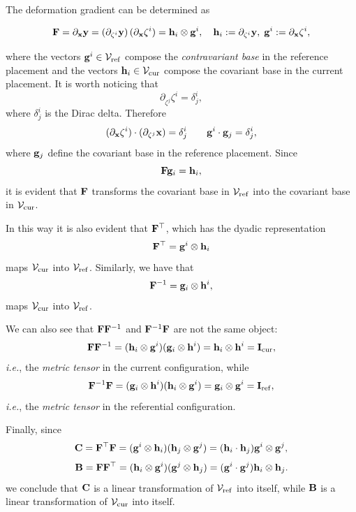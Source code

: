 	
	The deformation gradient can be determined as
\begin{definition}
		\begin{equation}\label{Fdy}
		\mathbf{F}=\partial_{\mathbf{x}} \mathbf{y}=(\partial_{\zeta^i} \mathbf{y})\,(\partial_{\mathbf{x}}\zeta^i)=\mathbf{h}_i\otimes\mathbf{g}^i, \quad \mathbf{h}_i:=\partial_{\zeta^i} \mathbf{y}, \;\mathbf{g}^i:=\partial_{\mathbf{x}}\zeta^i,
	\end{equation}
\end{definition}
	where the vectors $\mathbf{g}^i\in\operatorname{\mathcal{V}_{\textrm ref}}$ compose the \textit{contravariant base} in the reference placement and the vectors $\mathbf{h}_i\in\operatorname{\mathcal{V}_{\textrm cur}}$ compose the covariant base in the current placement. It is worth noticing that 
	\begin{equation}
	\partial_{\zeta^j}\zeta^i=\delta^{i}_j,
	\end{equation}
where $\delta^{i}_j$ is the Dirac delta. Therefore
	\begin{equation}
		(\partial_{\mathbf{x}}\zeta^i)\cdot(\partial_{\zeta^j}\mathbf{x})=\delta^i_j \qquad \mathbf{g}^i\cdot\mathbf{g}_j={\delta}^i_j,
	\end{equation}
	where $\mathbf{g}_j$ define the covariant base in the reference placement. Since
	\begin{equation}
		\mathbf{F}\mathbf{g}_i=\mathbf{h}_i,
	\end{equation}
	it is evident that $\mathbf{F}$ transforms the covariant base in $\operatorname{\mathcal{V}_{\textrm ref}}$ into the covariant base in $\operatorname{\mathcal{V}_{\textrm cur}}$.
	
	In this way it is also evident that $\mathbf{F}^\top$, which has the dyadic representation
	\begin{equation}
		\mathbf{F}^\top=\mathbf{g}^i\otimes\mathbf{h}_i
	\end{equation}
	maps $\operatorname{\mathcal{V}_{\textrm cur}}$ into $\operatorname{\mathcal{V}_{\textrm ref}}$. Similarly, we have that
	\begin{equation}
		\mathbf{F}^{-1}=\mathbf{g}_i\otimes\mathbf{h}^i,
	\end{equation}
	maps   $\operatorname{\mathcal{V}_{\textrm cur}}$ into $\operatorname{\mathcal{V}_{\textrm ref}}$.

We can also see that $\mathbf{F}\mathbf{F}^{-1}$ and $\mathbf{F}^{-1}\mathbf{F}$ are not the same object:
\begin{equation}
\mathbf{F}\mathbf{F}^{-1}=(\mathbf{h}_i\otimes\mathbf{g}^i)(\mathbf{g}_i\otimes\mathbf{h}^i)=\mathbf{h}_i\otimes\mathbf{h}^i=\mathbf{I}_{\rm cur},
\end{equation}
\textit{i.e.}, the \textit{metric tensor} in the current configuration, while 
\begin{equation}
\mathbf{F}^{-1}\mathbf{F}=(\mathbf{g}_i\otimes\mathbf{h}^i)(\mathbf{h}_i\otimes\mathbf{g}^i)=\mathbf{g}_i\otimes \mathbf{g}^i=\mathbf{I}_{\rm ref},
\end{equation}
\textit{i.e.}, the \textit{metric tensor} in the referential configuration.

Finally, since
	\begin{equation}
		\mathbf{C}=\mathbf{F}^\top\mathbf{F}=(\mathbf{g}^i\otimes\mathbf{h}_i)(\mathbf{h}_j\otimes\mathbf{g}^j)=(\mathbf{h}_i\cdot\mathbf{h}_j)\mathbf{g}^i\otimes\mathbf{g}^j,
	\end{equation}
	\begin{equation}
		\mathbf{B}=\mathbf{F}\mathbf{F}^\top= (\mathbf{h}_i\otimes\mathbf{g}^i)(\mathbf{g}^j\otimes\mathbf{h}_j)=(\mathbf{g}^i\cdot\mathbf{g}^j)\mathbf{h}_i\otimes\mathbf{h}_j.
	\end{equation}
	we conclude that $\mathbf{C}$ is a linear transformation of $\operatorname{\mathcal{V}_{\textrm ref}}$ into itself, while $\mathbf{B}$ is  a linear transformation of $\operatorname{\mathcal{V}_{\textrm cur}}$ into itself.



